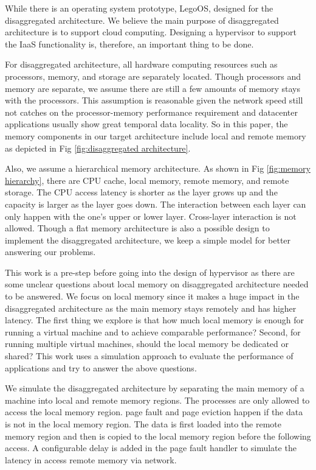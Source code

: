 \documentclass[twocolumn]{article}
\begin{document}
While there is an operating system prototype, LegoOS\cite{LegoOS}, designed for the disaggregated architecture. We believe the main purpose of disaggregated architecture is to support cloud computing. Designing a hypervisor to support the IaaS functionality is, therefore, an important thing to be done.

For disaggregated architecture, all hardware computing resources such as processors, memory, and storage are separately located. Though processors and memory are separate, we assume there are still a few amounts of memory stays with the processors. This assumption is reasonable given the network speed still not catches on the processor-memory performance requirement\cite{Network_requirement} and datacenter applications usually show great temporal data locality\cite{NN_load,MapReduce_load}. So in this paper, the memory components in our target architecture include local and remote memory as depicted in Fig \ref{fig:disaggregated architecture}.

Also, we assume a hierarchical memory architecture. As shown in Fig \ref{fig:memory hierarchy}, there are CPU cache, local memory, remote memory, and remote storage. The CPU access latency is shorter as the layer grows up and the capacity is larger as the layer goes down. The interaction between each layer can only happen with the one's upper or lower layer. Cross-layer interaction is not allowed. Though a flat memory architecture is also a possible design to implement the disaggregated architecture, we keep a simple model for better answering our problems.

This work is a pre-step before going into the design of hypervisor as there are some unclear questions about local memory on disaggregated architecture needed to be answered. We focus on local memory since it makes a huge impact in the disaggregated architecture as the main memory stays remotely and has higher latency. The first thing we explore is that how much local memory is enough for running a virtual machine and to achieve comparable performance? Second, for running multiple virtual machines, should the local memory be dedicated or shared? This work uses a simulation approach to evaluate the performance of applications and try to answer the above questions.

We simulate the disaggregated architecture by separating the main memory of a machine into local and remote memory regions. The processes are only allowed to access the local memory region. page fault and page eviction happen if the data is not in the local memory region. The data is first loaded into the remote memory region and then is copied to the local memory region before the following access. A configurable delay is added in the page fault handler to simulate the latency in access remote memory via network.
\end{document}
